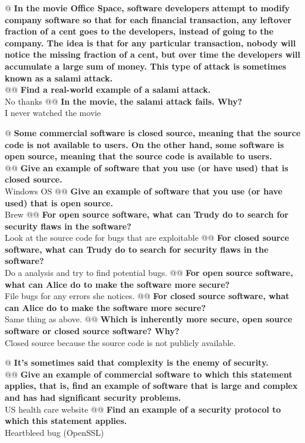 \documentclass{article}
\begin{document}
\begin{easylist}
 	@ \textbf{In the movie Office Space, software developers attempt to modify company software so that for each financial transaction, any leftover fraction of a cent goes to the developers, instead of going to the company. The idea is that for any particular transaction, nobody will notice the missing fraction of a cent, but over time the developers will accumulate a large sum of money. This type of attack is sometimes known as a salami attack.}\\
 	@@ \textbf{Find a real-world example of a salami attack.}\\
 		No thanks
 	@@ \textbf{In the movie, the salami attack fails. Why?}\\
 		I never watched the movie
 	
 	@ \textbf{Some commercial software is closed source, meaning that the source code is not available to users. On the other hand, some software is open source, meaning that the source code is available to users.}\\
 	@@ \textbf{Give an example of software that you use (or have used) that is closed source.}\\
 		Windows OS
 	@@ \textbf{Give an example of software that you use (or have used) that is open source.}\\
 		Brew
 	@@ \textbf{For open source software, what can Trudy do to search for security flaws in the software?}\\
 		Look at the source code for bugs that are exploitable
 	@@ \textbf{For closed source software, what can Trudy do to search for security flaws in the software?}\\
 		Do a analysis and try to find potential bugs.
 	@@ \textbf{For open source software, what can Alice do to make the software more secure?}\\
 		File bugs for any errors she notices.
 	@@ \textbf{For closed source software, what can Alice do to make the software more secure?}\\
 		Same thing as above.
 	@@ \textbf{Which is inherently more secure, open source software or closed source software? Why?}\\
 		Closed source because the source code is not publicly available.
 	
 	@ \textbf{It's sometimes said that complexity is the enemy of security.}\\
 	@@ \textbf{Give an example of commercial software to which this statement applies, that is, find an example of software that is large and complex and has had significant security problems.}\\
 		US health care website
 	@@ \textbf{Find an example of a security protocol to which this statement applies.}\\
 		Heartbleed bug (OpenSSL)
 	

\end{easylist}
\end{document}
